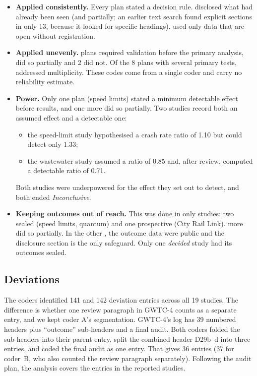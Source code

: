 \begin{itemize}
\item \textbf{Applied consistently.} Every plan stated a decision rule. \InvDisclosure{} disclosed what had already
been seen (and \InvDisclosurePartial{} partially; an earlier text search found explicit sections in only 13, because it
looked for specific headings). \InvDataOpen{} used only data that are open without registration.
\item \textbf{Applied unevenly.} \InvValidation{} plans required validation before the primary analysis,
\InvValidationPartial{} did so partially and 2 did not. Of the 8 plans with several primary tests, \InvMultiplicityYes{}
addressed multiplicity. These codes come from a single coder and carry no reliability estimate.
\item \textbf{Power.} Only one plan (speed limits) stated a minimum detectable effect before results, and one more did
so partially. Two studies record both an assumed effect and a detectable one:
  \begin{itemize}
  \item the speed-limit study hypothesised a crash rate ratio of 1.10 but could detect only 1.33;
  \item the wastewater study assumed a ratio of 0.85 and, after review, computed a detectable ratio of 0.71.
  \end{itemize}
Both studies were underpowered for the effect they set out to detect, and both ended \emph{Inconclusive}.
\item \textbf{Keeping outcomes out of reach.} This was done in only \InvBlindStrong{} studies: two sealed (speed
limits, quantum) and one prospective (City Rail Link). \InvBlindPartial{} more did so partially. In the other
\InvBlindNone{}, the outcome data were public and the disclosure section is the only safeguard. Only one
\emph{decided} study had its outcomes sealed.
\end{itemize}

\subsection{Deviations}

The coders identified 141 and 142 deviation entries across all 19 studies. The difference is whether one review
paragraph in GWTC-4 counts as a separate entry, and we kept coder A's segmentation. GWTC-4's log has 39 numbered
headers plus ``outcome'' sub-headers and a final audit. Both coders folded the sub-headers into their parent entry,
split the combined header D29b--d into three entries, and coded the final audit as one entry. That gives 36 entries (37 for coder~B, who also counted the review paragraph
separately). Following the audit plan, the
analysis covers the \DevN{} entries in the \StudiesReported{} reported studies.

